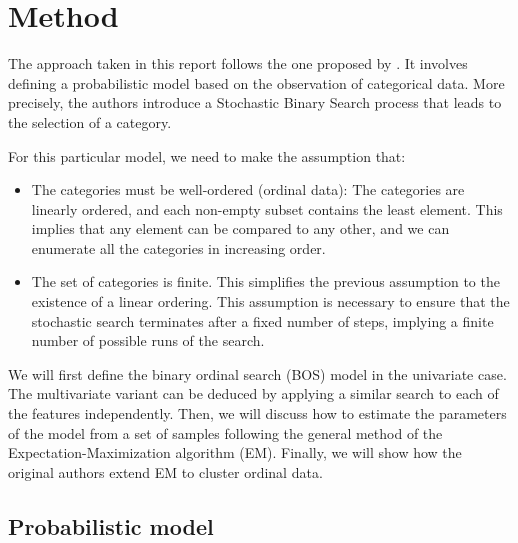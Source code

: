 \section{Method}
The approach taken in this report follows the one proposed by \cite{biernacki2016model}. It involves defining a probabilistic model based on the observation of categorical data. More precisely, the authors introduce a Stochastic Binary Search process that leads to the selection of a category. 

For this particular model, we need to make the assumption that:
\begin{itemize}
    \item The categories must be well-ordered (ordinal data): The categories are linearly ordered, and each non-empty subset contains the least element. This implies that any element can be compared to any other, and we can enumerate all the categories in increasing order.
    \item The set of categories is finite. This simplifies the previous assumption to the existence of a linear ordering. This assumption is necessary to ensure that the stochastic search terminates after a fixed number of steps, implying a finite number of possible runs of the search.
\end{itemize}
We will first define the binary ordinal search (BOS) model in the univariate case. The multivariate variant can be deduced by applying a similar search to each of the features independently. Then, we will discuss how to estimate the parameters of the model from a set of samples following the general method of the Expectation-Maximization algorithm (EM). Finally, we will show how the original authors extend EM to cluster ordinal data.

\subsection{Probabilistic model}


